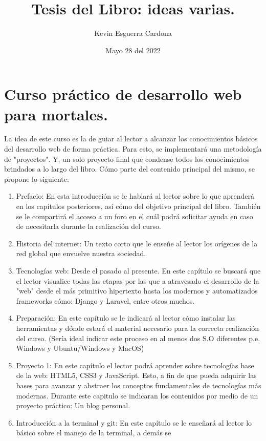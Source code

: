 \documentclass{article}
\title{Tesis del Libro: ideas varias.}
\author{Kevin  Esguerra Cardona}
\date{Mayo 28 del 2022}
\begin{document}
\maketitle

\section{Curso práctico de desarrollo web para mortales.}
La idea de este curso es la de guiar al lector a alcanzar los conocimientos básicos del desarrollo web de forma práctica.
Para esto, se implementará una metodología de "proyectos". Y, un solo proyecto final que condense todos los conocimientos brindados a lo
largo del libro. Cómo parte del contenido principal del mismo, se propone lo siguiente:
\begin{enumerate}
    \item Prefacio: En esta introducción se le hablará al lector sobre lo que aprenderá en los capítulos posteriores, así cómo del objetivo
    principal del libro. También se le compartirá el acceso a un foro en el cuál podrá solicitar ayuda en caso de necesitarla durante la
    realización del curso. 
    \item Historia del internet: Un texto corto que le enseñe al lector los orígenes de la red global que envuelve nuestra sociedad. 
    \item Tecnologías web: Desde el pasado al presente. \newline En este capítulo se buscará que el lector visualice todas las etapas por
    las que a atravesado el desarrollo de la "web" desde el más primitivo hipertexto hasta los modernos y automatizados frameworks cómo:
    Django y Laravel, entre otros muchos. 
    \item Preparación: En este capítulo se le indicará al lector cómo instalar las herramientas y dónde estará el material necesario para la
    correcta realización del curso. (Sería ideal indicar este proceso en al menos dos S.O diferentes p.e. Windows y Ubuntu/Windows y MacOS)
    \item Proyecto 1: En este capítulo el lector podrá aprender sobre tecnologías base de la web: HTML5, CSS3 y JavaScript. 
    Esto, a fin de que pueda adquirir las bases para avanzar y abstraer los conceptos fundamentales de tecnologías más modernas. 
    Durante este capitulo se indicaran los contenidos por medio de un proyecto práctico: Un blog personal.
    \item Introducción a la terminal y git: En este capítulo se le enseñará al lector lo básico sobre el manejo de la terminal, a demás se

\end{enumerate}
\end{document}
